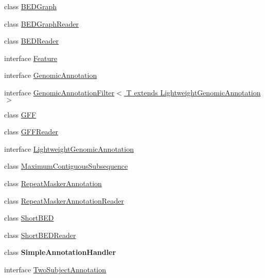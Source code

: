 \begin{DoxyCompactItemize}
\item 
class \hyperlink{classbroad_1_1core_1_1annotation_1_1_b_e_d_graph}{B\+E\+D\+Graph}
\item 
class \hyperlink{classbroad_1_1core_1_1annotation_1_1_b_e_d_graph_reader}{B\+E\+D\+Graph\+Reader}
\item 
class \hyperlink{classbroad_1_1core_1_1annotation_1_1_b_e_d_reader}{B\+E\+D\+Reader}
\item 
interface \hyperlink{interfacebroad_1_1core_1_1annotation_1_1_feature}{Feature}
\item 
interface \hyperlink{interfacebroad_1_1core_1_1annotation_1_1_genomic_annotation}{Genomic\+Annotation}
\item 
interface \hyperlink{interfacebroad_1_1core_1_1annotation_1_1_genomic_annotation_filter_3_01_t_01extends_01_lightweight_genomic_annotation_01_4}{Genomic\+Annotation\+Filter$<$ T extends Lightweight\+Genomic\+Annotation $>$}
\item 
class \hyperlink{classbroad_1_1core_1_1annotation_1_1_g_f_f}{G\+F\+F}
\item 
class \hyperlink{classbroad_1_1core_1_1annotation_1_1_g_f_f_reader}{G\+F\+F\+Reader}
\item 
interface \hyperlink{interfacebroad_1_1core_1_1annotation_1_1_lightweight_genomic_annotation}{Lightweight\+Genomic\+Annotation}
\item 
class \hyperlink{classbroad_1_1core_1_1annotation_1_1_maximum_contiguous_subsequence}{Maximum\+Contiguous\+Subsequence}
\item 
class \hyperlink{classbroad_1_1core_1_1annotation_1_1_repeat_masker_annotation}{Repeat\+Masker\+Annotation}
\item 
class \hyperlink{classbroad_1_1core_1_1annotation_1_1_repeat_masker_annotation_reader}{Repeat\+Masker\+Annotation\+Reader}
\item 
class \hyperlink{classbroad_1_1core_1_1annotation_1_1_short_b_e_d}{Short\+B\+E\+D}
\item 
class \hyperlink{classbroad_1_1core_1_1annotation_1_1_short_b_e_d_reader}{Short\+B\+E\+D\+Reader}
\item 
class {\bfseries Simple\+Annotation\+Handler}
\item 
interface \hyperlink{interfacebroad_1_1core_1_1annotation_1_1_two_subject_annotation}{Two\+Subject\+Annotation}
\end{DoxyCompactItemize}
